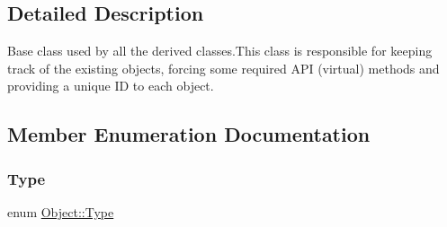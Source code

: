 \subsection{Detailed Description}
Base class used by all the derived classes.\+This class is responsible for keeping track of the existing objects, forcing some required A\+PI (virtual) methods and providing a unique ID to each object. 

\subsection{Member Enumeration Documentation}
\mbox{\label{classObject_ad8dadb365053c182931671a424199e36}} 
\subsubsection{\texorpdfstring{Type}{Type}}
{\footnotesize\ttfamily enum \hyperlink{classObject_ad8dadb365053c182931671a424199e36}{Object\+::\+Type}}

